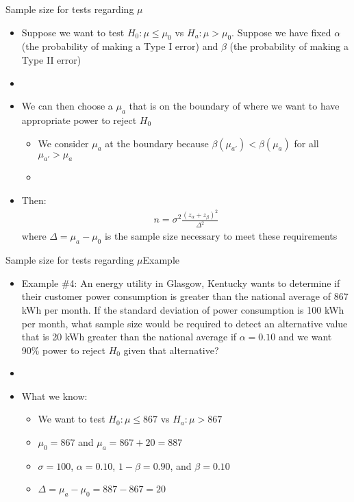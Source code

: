 \documentclass[xcolor=dvipsnames]{beamer}
\begin{document}
\begin{frame}{Sample size for tests regarding $\mu$}
	\begin{itemize}
		\item Suppose we want to test $H_0: \mu \leq \mu_0$ vs $H_a: \mu > \mu_0$. Suppose we have fixed $\alpha$ (the probability of making a Type I error) and $\beta$ (the probability of making a Type II error)
		\item[]
		\item We can then choose a $\mu_a$ that is on the boundary of where we want to have appropriate power to reject $H_0$
		\begin{itemize}
			\item We consider $\mu_a$ at the boundary because $\beta(\mu_{a'}) < \beta(\mu_a)$ for all $\mu_{a'} > \mu_a$
			\item[]
		\end{itemize}
	\item Then:
	\begin{gather*}
		n = \sigma^2\frac{(z_{\alpha} + z_{\beta})^2}{\Delta^2}
	\end{gather*}
	where $\Delta = \mu_a - \mu_0 $ is the sample size necessary to meet these requirements
	\end{itemize}
\end{frame}

\begin{frame}{Sample size for tests regarding $\mu$}{Example}
	\begin{itemize}
		\item Example \#4: An energy utility in Glasgow, Kentucky wants to determine if their customer power consumption is greater than the national average of 867 kWh per month. If the standard deviation of power consumption is 100 kWh per month, what sample size would be required to detect an alternative value that is 20 kWh greater than the national average if $\alpha = 0.10$ and we want 90\% power to reject $H_0$ given that alternative?
		\item[]
		\item What we know:
		\begin{itemize}
			\item We want to test $H_0: \mu \leq 867$ vs $H_a: \mu > 867$
			\item $\mu_0 = 867$ and $\mu_a = 867+20=887$
			\item $\sigma = 100$, $\alpha = 0.10$, $1-\beta = 0.90$, and $\beta = 0.10$
			\item $\Delta = \mu_a - \mu_0 = 887-867 = 20$
		\end{itemize}
	\end{itemize}
\end{frame}
\end{document}
